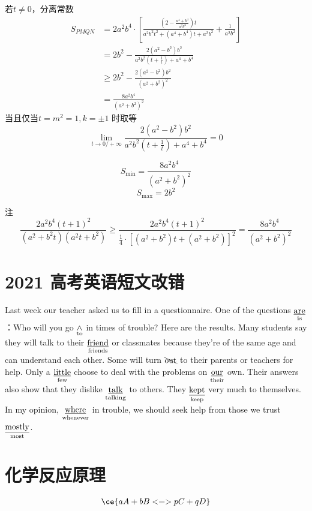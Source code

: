 \documentclass[UTF8]{article}
\begin{document}
若$t \ne   0$，分离常数
$$
\begin{aligned}
 {S_{PMQN}}& = 2{a^2}{b^4} \cdot \left[ {\frac{{\left( {2 - \frac{{{a^4} + {b^4}}}{{{a^2}{b^2}}}} \right)t}}{{{a^2}{b^2}{t^2} + ({a^4} + {b^4})t + {a^2}{b^2}}} + \frac{1}{{{a^2}{b^2}}}} \right]
 \\&=2{b^2} - \frac{{2({a^2} - {b^2}){b^2}}}{{{a^2}{b^2}\left( {t + \frac{1}{t}} \right) + {a^4} + {b^4}}}
 \\&\ge 2{b^2} - \frac{{2({a^2} - {b^2}){b^2}}}{{{{({a^2} + {b^2})}^2}}}
 \\&=\frac{{8{a^2}{b^4}}}{{{{({a^2} + {b^2})}^2}}}
\end{aligned}
$$
当且仅当$t=m^2=1,k=\pm 1$ 时取等
$$
\lim_{t \to 0/+\infty} \frac{{2({a^2} - {b^2}){b^2}}}{{{a^2}{b^2}\left( {t + \frac{1}{t}} \right) + {a^4} + {b^4}}}=0
$$

$$
  {S_{{\text{min}}}}=\frac{{8{a^2}{b^4}}}{{{{({a^2} + {b^2})}^2}}}
  $$
$$
  {S_{{\text{max}}}}  = 2{b^2}
$$

注
$$
\frac{{2{a^2}{b^4}{{({t} + 1)}^2}}}{{({a^2} + {b^2}{t})({a^2}{t} + {b^2})}}\ge\frac{{2{a^2}{b^4}{{(t + 1)}^2}}}{{\frac{1}{4} \cdot {{[({a^2} + {b^2})t + ({a^2} + {b^2})]}^2}}}=\frac{{8{a^2}{b^4}}}{{{{({a^2} + {b^2})}^2}}}
$$
\section{2021 高考英语短文改错}

Last week our teacher asked us to fill in a questionnaire. One of the questions $\rm\underset{is}{\underline{are}}$：Who will you go $\rm \underset{to}{\wedge}$ in times of trouble? Here are the results. Many students say they will talk to their $\rm \underset{friends}{\underline{friend}}$ or classmates because they're of the same age and can understand each other. Some will turn $\rm \bcancel{\text{out}}$ to their parents or teachers for help. Only a $\rm \underset{few}{\underline{little}}$ choose to deal with the problems on $\rm \underset{their}{\underline{our}}$ own. Their answers also show that they dislike $\rm \underset{talking}{\underline{talk}}$ to others. They $\rm \underset{keep}{\underline{kept}}$ very much to themselves. In my opinion, $\rm \underset{whenever}{\underline{where}}$ in trouble, we should seek help from those we trust $\rm \underset{most}{\underline{mostly}}$.

\section{化学反应原理}
$$
\ce{a A +b B<=> pC +qD}
$$
\end{document}
